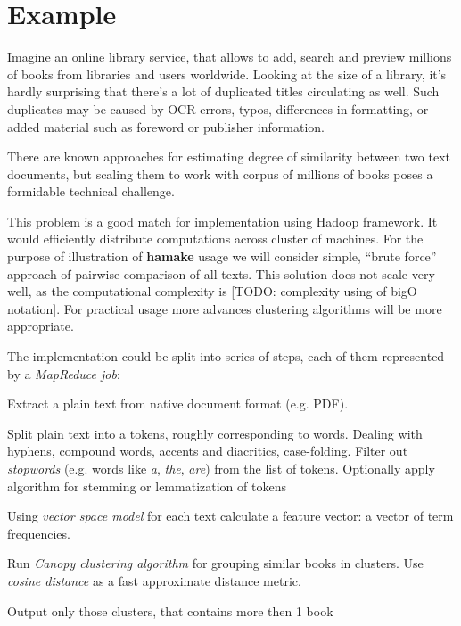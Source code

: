 \documentclass[10pt,conference,letterpaper]{IEEEtran}
\begin{document}
\section{Example}

Imagine an online library service, that allows to add, search and
preview millions of books from libraries and users worldwide. Looking
at the size of a library, it's hardly surprising that there's a lot of
duplicated titles circulating as well. Such duplicates may be caused
by OCR errors, typos, differences in formatting, or added material such as
foreword or publisher information.

There are known approaches for estimating degree of similarity between
two text documents, but scaling them to work with corpus of millions
of books poses a formidable technical challenge.

This problem is a good match for implementation using Hadoop
framework. It would efficiently distribute computations across cluster
of machines. For the purpose of illustration of \textbf{hamake} usage we will
consider simple, ``brute force'' approach of pairwise comparison of
all texts. This solution does not scale very well, as the
computational complexity is [TODO: complexity using of bigO
notation]. For practical usage more advances clustering algorithms
will be more appropriate.

The implementation could be split into series of steps, each of them
represented by a \textit{MapReduce job}:

\begin{description}
\item[\emph{ExtractText}] Extract a plain text from native document format
  (e.g. PDF).
\item[\emph{Tokenize}] Split plain text into a tokens, roughly
  corresponding to words. Dealing with hyphens, compound words,
  accents and diacritics, case-folding. Filter out \textit{stopwords} (e.g. words
  like \textit{a}, \textit{the}, \textit{are}) from the list of
  tokens. Optionally apply algorithm for stemming or lemmatization of tokens 
\item[\emph{CalculateTF}] Using \textit{vector space
    model}\cite{manning2008introduction} for each text calculate a
  feature vector: a vector of term frequencies.
\item[\emph{Clusterize}] Run \textit{Canopy clustering
    algorithm}\cite{efficientClustering} for grouping similar books in clusters. Use
    \textit{cosine distance} as a fast approximate distance metric.
\item[\emph{FindSimilar}] Output only those clusters, that contains 
    more then 1 book
\end{description}
\end{document}
